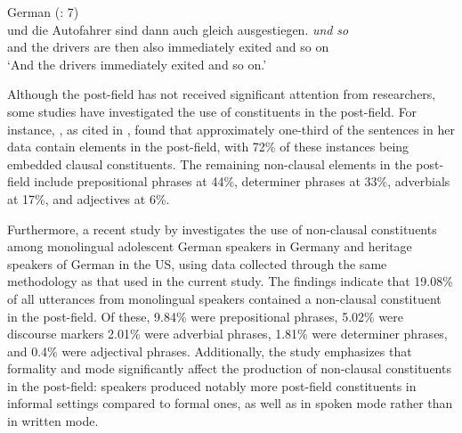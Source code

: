 \ea%
  \label{ex:key:C} German (\citealt{Tsehaye2023}: 7) \\
\gll und   die  Autofahrer sind   dann   auch   gleich     ausgestiegen. \textit{und} \textit{so}\\
and  the drivers    are  then  also  immediately  exited    and  so on\\
\glt ‘And the drivers immediately exited and so on.’
  \z

Although the post-field has not received significant attention from researchers, some studies have investigated the use of constituents in the post-field. For instance, \citet{Proske2010}, as cited in \citet{Hartmann2017}, found that approximately one-third of the sentences in her data contain elements in the post-field, with 72\% of these instances being embedded clausal constituents. The remaining non-clausal elements in the post-field include prepositional phrases at 44\%, determiner phrases at 33\%, adverbials at 17\%, and adjectives at 6\%.

Furthermore, a recent study by \citet{Tsehaye2023} investigates the use of non-clausal constituents among monolingual adolescent German speakers in Germany and heritage speakers of German in the US, using data collected through the same methodology as that used in the current study. The findings indicate that 19.08\% of all utterances from monolingual speakers contained a non-clausal constituent in the post-field. Of these, 9.84\% were prepositional phrases, 5.02\% were discourse markers 2.01\% were adverbial phrases, 1.81\% were determiner phrases, and 0.4\% were adjectival phrases. Additionally, the study emphasizes that formality and mode significantly affect the production of non-clausal constituents in the post-field: speakers produced notably more post-field constituents in informal settings compared to formal ones, as well as in spoken mode rather than in written mode.

